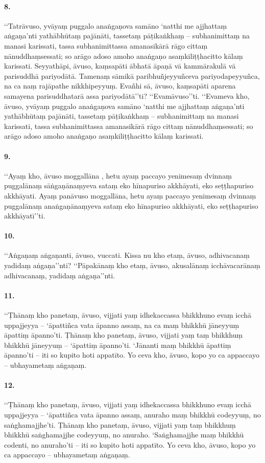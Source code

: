\paragraph{8.} ‘‘Tatrāvuso, yvāyaṃ puggalo anaṅgaṇova samāno ‘natthi me ajjhattaṃ aṅgaṇa’nti yathābhūtaṃ pajānāti, tassetaṃ pāṭikaṅkhaṃ – subhanimittaṃ na manasi karissati, tassa subhanimittassa amanasikārā rāgo cittaṃ nānuddhaṃsessati; so arāgo adoso amoho anaṅgaṇo asaṃkiliṭṭhacitto kālaṃ karissati. Seyyathāpi, āvuso, kaṃsapāti ābhatā āpaṇā vā kammārakulā vā parisuddhā pariyodātā. Tamenaṃ sāmikā paribhuñjeyyuñceva pariyodapeyyuñca, na ca naṃ rajāpathe nikkhipeyyuṃ. Evañhi sā, āvuso, kaṃsapāti aparena samayena parisuddhatarā assa pariyodātā’’ti? ‘‘Evamāvuso’’ti. ‘‘Evameva kho, āvuso, yvāyaṃ puggalo anaṅgaṇova samāno ‘natthi me ajjhattaṃ aṅgaṇa’nti yathābhūtaṃ pajānāti, tassetaṃ pāṭikaṅkhaṃ – subhanimittaṃ na manasi karissati, tassa subhanimittassa amanasikārā rāgo cittaṃ nānuddhaṃsessati; so arāgo adoso amoho anaṅgaṇo asaṃkiliṭṭhacitto kālaṃ karissati.

\paragraph{9.} ‘‘Ayaṃ kho, āvuso moggallāna , hetu ayaṃ paccayo yenimesaṃ dvinnaṃ puggalānaṃ sāṅgaṇānaṃyeva sataṃ eko hīnapuriso akkhāyati, eko seṭṭhapuriso akkhāyati. Ayaṃ panāvuso moggallāna, hetu ayaṃ paccayo yenimesaṃ dvinnaṃ puggalānaṃ anaṅgaṇānaṃyeva sataṃ eko hīnapuriso akkhāyati, eko seṭṭhapuriso akkhāyatī’’ti.

\paragraph{10.} ‘‘Aṅgaṇaṃ aṅgaṇanti, āvuso, vuccati. Kissa nu kho etaṃ, āvuso, adhivacanaṃ yadidaṃ aṅgaṇa’’nti? ‘‘Pāpakānaṃ kho etaṃ, āvuso, akusalānaṃ icchāvacarānaṃ adhivacanaṃ, yadidaṃ aṅgaṇa’’nti.

\paragraph{11.} ‘‘Ṭhānaṃ kho panetaṃ, āvuso, vijjati yaṃ idhekaccassa bhikkhuno evaṃ icchā uppajjeyya – ‘āpattiñca vata āpanno assaṃ, na ca maṃ bhikkhū jāneyyuṃ āpattiṃ āpanno’ti. Ṭhānaṃ kho panetaṃ, āvuso, vijjati yaṃ taṃ bhikkhuṃ bhikkhū jāneyyuṃ – ‘āpattiṃ āpanno’ti. ‘Jānanti maṃ bhikkhū āpattiṃ āpanno’ti – iti so kupito hoti appatīto. Yo ceva kho, āvuso, kopo yo ca appaccayo – ubhayametaṃ aṅgaṇaṃ.

\paragraph{12.} ‘‘Ṭhānaṃ kho panetaṃ, āvuso, vijjati yaṃ idhekaccassa bhikkhuno evaṃ icchā uppajjeyya – ‘āpattiñca vata āpanno assaṃ, anuraho maṃ bhikkhū codeyyuṃ, no saṅghamajjhe’ti. Ṭhānaṃ kho panetaṃ, āvuso, vijjati yaṃ taṃ bhikkhuṃ bhikkhū saṅghamajjhe codeyyuṃ, no anuraho. ‘Saṅghamajjhe maṃ bhikkhū codenti, no anuraho’ti – iti so kupito hoti appatīto. Yo ceva kho, āvuso, kopo yo ca appaccayo – ubhayametaṃ aṅgaṇaṃ.

